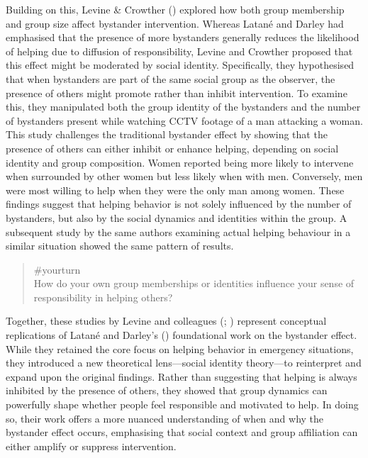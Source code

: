 \documentclass[
  letterpaper,
]{book}
\begin{document}
Building on this, Levine \& Crowther
() explored how both group
membership and group size affect bystander intervention. Whereas Latané
and Darley had emphasised that the presence of more bystanders generally
reduces the likelihood of helping due to diffusion of responsibility,
Levine and Crowther proposed that this effect might be moderated by
social identity. Specifically, they hypothesised that when bystanders
are part of the same social group as the observer, the presence of
others might promote rather than inhibit intervention. To examine this,
they manipulated both the group identity of the bystanders and the
number of bystanders present while watching CCTV footage of a man
attacking a woman. This study challenges the traditional bystander
effect by showing that the presence of others can either inhibit or
enhance helping, depending on social identity and group composition.
Women reported being more likely to intervene when surrounded by other
women but less likely when with men. Conversely, men were most willing
to help when they were the only man among women. These findings suggest
that helping behavior is not solely influenced by the number of
bystanders, but also by the social dynamics and identities within the
group. A subsequent study by the same authors examining actual helping
behaviour in a similar situation showed the same pattern of results.

\begin{quote}
{\#yourturn}\\
How do your own group memberships or identities influence your sense of
responsibility in helping others?
\end{quote}

Together, these studies by Levine and colleagues
(;
)
represent conceptual replications of Latané and Darley's
() foundational work on the
bystander effect. While they retained the core focus on helping behavior
in emergency situations, they introduced a new theoretical lens---social
identity theory---to reinterpret and expand upon the original findings.
Rather than suggesting that helping is always inhibited by the presence
of others, they showed that group dynamics can powerfully shape whether
people feel responsible and motivated to help. In doing so, their work
offers a more nuanced understanding of when and why the bystander effect
occurs, emphasising that social context and group affiliation can either
amplify or suppress intervention.
\end{document}
